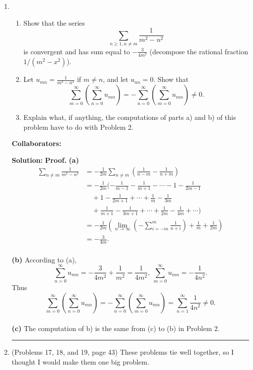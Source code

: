 \documentclass{article}%
\newenvironment{proof}[1][Proof]{\textbf{#1.} }{\ \rule{0.5em}{0.5em}}
\begin{document}
\begin{enumerate}
\item \begin{enumerate}
\item Show that the series \[
\sum_{n\geq 1, n\neq m} \frac{1}{m^2 - n^2}\]is convergent and has sum equal to $-\frac{3}{4m^2}$ (decompose the rational fraction $1/(m^2 - x^2)$).
\item Let $u_{mn} = \frac{1}{m^2 - n^2}$ if $m\neq n$, and let $u_{nn} = 0$. Show that \[
\sum_{m=0}^{\infty}\left(\sum_{n=0}^{\infty} u_{mn}\right) = -\sum_{n=0}^{\infty}\left(\sum_{m=0}^{\infty} u_{mn}\right) \neq 0.\]
\item Explain what, if anything, the computations of parts a) and b) of this problem have to do with Problem 2.
\end{enumerate}


\bigskip
\textbf{Collaborators:}\\
\smallskip
 
\textbf{Solution:}
\begin{proof}
\textbf{(a)} \\[2pt]
$$
\begin{aligned}
\sum_{n\ne m}\frac{1}{m^2-n^2} &= -\frac{1}{2m}\sum_{n\ne m}\left(\frac{1}{n-m}-\frac{1}{n+m} \right)\\
&=-\frac{1}{2m}(-\frac{1}{m-1}-\frac{1}{m+1}-\cdots-1-\frac{1}{2m-1}\\
&\quad + 1-\frac{1}{2m+1}+\cdots+\frac{1}{m}-\frac{1}{3m}\\
&\quad + \frac{1}{m+1}-\frac{1}{3m+1}+\cdots+\frac{1}{2m}-\frac{1}{4m}+\cdots) \\
&= -\frac{1}{2m}\left(\lim_{n\to\infty}(-\sum_{i=-m}^{m}\frac{1}{n+i}) + \frac{1}{m} + \frac{1}{2m}\right) \\
&= -\frac{3}{4m}.
\end{aligned}
$$
\\
\textbf{(b)} 
According to (a),
$$
\sum_{n=0}^{\infty}u_{mn} = -\frac{3}{4m^2}+\frac{1}{m^2} = \frac{1}{4m^2}, ~\sum_{m=0}^{\infty}u_{mn} = -\frac{1}{4n^2}.
$$
Thus
$$
\sum_{m=0}^{\infty}\left(\sum_{n=0}^{\infty} u_{mn}\right) = -\sum_{n=0}^{\infty}\left(\sum_{m=0}^{\infty} u_{mn}\right) = \sum_{n=1}^{\infty}\frac{1}{4n^2}\ne 0.
$$
\\
\textbf{(c)}
The computation of b) is the same from (c) to (b) in Problem 2.
\end{proof}
\bigskip



\item (Problems 17, 18, and 19, page 43) These problems tie well together, so I thought I would make them one big problem.


\end{enumerate}
\end{document}
